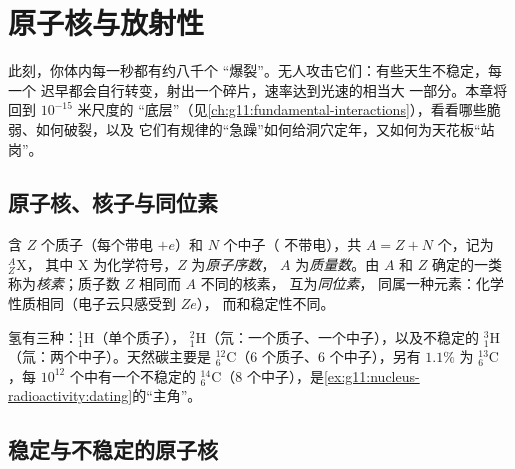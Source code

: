 \chapter{原子核与放射性}\label{ch:g11:nucleus-radioactivity}

此刻，你体内每一秒都有约八千个
“爆裂”。无人攻击它们：有些天生不稳定，每一个
迟早都会自行转变，射出一个碎片，速率达到光速的相当大
一部分。本章将回到 $10^{-15}$ 米尺度的
“底层”（见\cref{ch:g11:fundamental-interactions}），看看哪些脆弱、如何破裂，以及
它们有规律的“急躁”如何给洞穴定年，又如何为天花板“站岗”。

\section{原子核、核子与同位素}

\begin{definition}[原子核记号]\label{def:g11:nucleus-radioactivity:notation}
含 $Z$ 个质子（每个带电 $+e$）和 $N$ 个中子（
不带电），共 $A = Z + N$ 个，记为 ${}^{A}_{Z}\mathrm{X}$，
其中 $\mathrm X$ 为化学符号，$Z$ 为\emph{原子序数}，
$A$ 为\emph{质量数}。由 $A$ 和 $Z$ 确定的一类
称为\emph{核素}；质子数 $Z$ 相同而 $A$ 不同的核素，
互为\emph{同位素}，
同属一种元素：化学性质相同（电子云只感受到 $Ze$），
而和稳定性不同。
\end{definition}

\begin{example}[氢与碳]\label{ex:g11:nucleus-radioactivity:hc}
氢有三种：${}^{1}_{1}\mathrm{H}$（单个质子），
${}^{2}_{1}\mathrm{H}$（氘：一个质子、一个中子），以及不稳定的
${}^{3}_{1}\mathrm{H}$（氚：两个中子）。天然碳主要是
${}^{12}_{6}\mathrm{C}$（$6$ 个质子、$6$ 个中子），另有 $1.1\%$ 为
${}^{13}_{6}\mathrm{C}$，每 $10^{12}$ 个中有一个不稳定的
${}^{14}_{6}\mathrm{C}$（$8$ 个中子），是\cref{ex:g11:nucleus-radioactivity:dating}的“主角”。
\end{example}

\section{稳定与不稳定的原子核}

